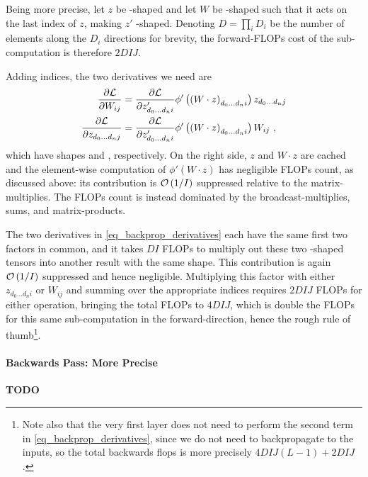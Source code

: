 \documentclass[11pt]{article}
\begin{document}
Being more precise, let $ z $ be -shaped and let $ W $ be
-shaped such that it acts on the last index of $ z $, making $ z' $
-shaped. Denoting $D=\prod _{ i } D _{ i } $ be the number of elements
along the $ D _{ i } $ directions for brevity, the forward-FLOPs cost of the sub-computation is
therefore $ 2DIJ$.


Adding indices, the two derivatives we need are
\begin{align}
    \frac{ \partial \Lcal  }{ \partial W _{ ij } } & = \frac{ \partial \Lcal  }{ \partial z '_{ d _{ 0 } \ldots  d _{ n }i } }\phi' \left (\left (  W \cdot z \right ) _{  d _{ 0 }\ldots d _{ n }i } \right )
	z _{ d _{ 0 }\ldots  d _{ n } j } \nn
	\frac{  \partial \Lcal  }{\partial  z _{ d _{ 0 }\ldots d _{ n }j } } & = \frac{ \partial \Lcal
	}{ \partial z '_{ d _{ 0 } \ldots  d _{ n }i } }\phi' \left (\left (  W \cdot z \right ) _{  d _{
			0 }\ldots d _{ n }i } \right ) W _{ ij }\ ,\label{eq_backprop_derivatives}
\end{align}
which have shapes  and , respectively. On the right
side, $ z $ and $ W \cdot  z $ are cached and the element-wise computation of $ \phi' \left ( W
\cdot z \right ) $ has negligible FLOPs count, as discussed above: its contribution is $ \mathcal{O}
\left( 1/I \right)  $ suppressed relative to the matrix-multiplies. The FLOPs count is instead
dominated by the broadcast-multiplies, sums, and matrix-products.

The two derivatives in \eqref{eq_backprop_derivatives} each have the same first two factors in
common, and it takes $ DI $ FLOPs to multiply out these two -shaped
tensors into another result with the same shape. This contribution is again $ \mathcal{O} \left( 1/I
\right)  $ suppressed and hence negligible. Multiplying this factor with either $ z
_{ d _{ 0 } \ldots d _{ n }i } $ or $ W _{ ij } $ and summing over the appropriate indices requires
$ 2DIJ $ FLOPs for either operation, bringing the total FLOPs to $ 4DIJ$, which is double the FLOPs
for this same sub-computation in the forward-direction, hence the rough rule of thumb\footnote{Note
    also that the very first layer does not need to perform the second term in
    \eqref{eq_backprop_derivatives}, since we do not need to backpropagate to the inputs, so the
    total backwards flops is more precisely $ 4DIJ(L-1) + 2DIJ$.}.


\paragraph{Backwards Pass: More Precise} \textbf{TODO}
\end{document}
